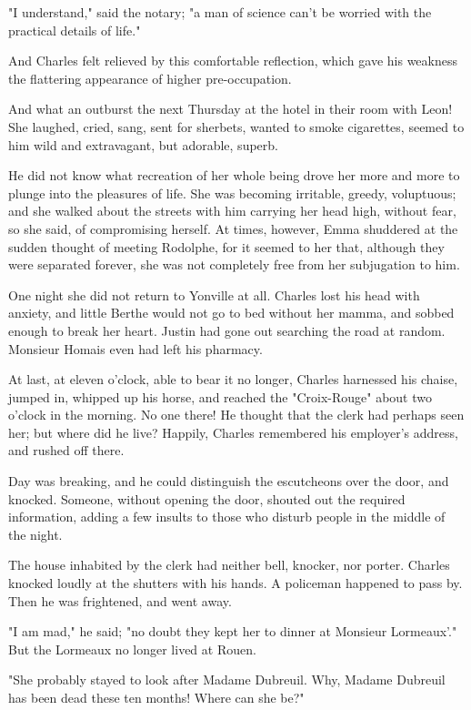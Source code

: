 \documentclass{tufte-book}
\begin{document}
"I understand," said the notary; "a man of science can't be worried with
the practical details of life."

And Charles felt relieved by this comfortable reflection, which gave his
weakness the flattering appearance of higher pre-occupation.

And what an outburst the next Thursday at the hotel in their room with
Leon! She laughed, cried, sang, sent for sherbets, wanted to smoke
cigarettes, seemed to him wild and extravagant, but adorable, superb.

He did not know what recreation of her whole being drove her more and
more to plunge into the pleasures of life. She was becoming irritable,
greedy, voluptuous; and she walked about the streets with him carrying
her head high, without fear, so she said, of compromising herself.
At times, however, Emma shuddered at the sudden thought of meeting
Rodolphe, for it seemed to her that, although they were separated
forever, she was not completely free from her subjugation to him.

One night she did not return to Yonville at all. Charles lost his head
with anxiety, and little Berthe would not go to bed without her mamma,
and sobbed enough to break her heart. Justin had gone out searching the
road at random. Monsieur Homais even had left his pharmacy.

At last, at eleven o'clock, able to bear it no longer, Charles
harnessed his chaise, jumped in, whipped up his horse, and reached the
"Croix-Rouge" about two o'clock in the morning. No one there! He thought
that the clerk had perhaps seen her; but where did he live? Happily,
Charles remembered his employer's address, and rushed off there.

Day was breaking, and he could distinguish the escutcheons over the
door, and knocked. Someone, without opening the door, shouted out the
required information, adding a few insults to those who disturb people
in the middle of the night.

The house inhabited by the clerk had neither bell, knocker, nor porter.
Charles knocked loudly at the shutters with his hands. A policeman
happened to pass by. Then he was frightened, and went away.

"I am mad," he said; "no doubt they kept her to dinner at Monsieur
Lormeaux'." But the Lormeaux no longer lived at Rouen.

"She probably stayed to look after Madame Dubreuil. Why, Madame Dubreuil
has been dead these ten months! Where can she be?"
\end{document}
